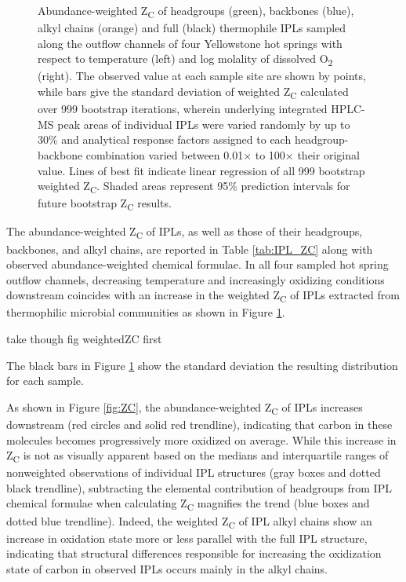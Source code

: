 {\begin{figure}[h]
\begin{subfigure}[b]{0.18\linewidth}
    \end{subfigure}
\caption[Abundance-weighted Z\textsubscript{C} of IPLs and their component parts]{Abundance-weighted Z\textsubscript{C} of headgroups (green), backbones (blue), alkyl chains (orange) and full (black) thermophile IPLs sampled along the outflow channels of four Yellowstone hot springs with respect to temperature (left) and log molality of dissolved O\textsubscript{2} (right). The observed value at each sample site are shown by points, while bars give the standard deviation of weighted Z\textsubscript{C} calculated over 999 bootstrap iterations, wherein underlying integrated HPLC-MS peak areas of individual IPLs were varied randomly by up to 30\% and analytical response factors assigned to each headgroup-backbone combination varied between 0.01$\times$ to 100$\times$ their original value. Lines of best fit indicate linear regression of all 999 bootstrap weighted Z\textsubscript{C}. Shaded areas represent 95\% prediction intervals for future bootstrap Z\textsubscript{C} results.}
\label{fig:weighted_ZC}
\end{figure}
\doublespace
\clearpage
}

The abundance-weighted Z\textsubscript{C} of IPLs, as well as those of their headgroups, backbones, and alkyl chains, are reported in Table \ref{tab:IPL_ZC} along with observed abundance-weighted chemical formulae. In all four sampled hot spring outflow channels, decreasing temperature and increasingly oxidizing conditions downstream coincides with an increase in the weighted Z\textsubscript{C} of IPLs extracted from thermophilic microbial communities as shown in Figure \ref{fig:weighted_ZC}.

take though fig weightedZC first


The black bars in Figure \ref{fig:weighted_ZC} show the standard deviation the resulting distribution for each sample.


As shown in Figure \ref{fig:ZC}, the abundance-weighted Z\textsubscript{C} of IPLs increases downstream (red circles and solid red trendline), indicating that carbon in these molecules becomes progressively more oxidized on average. While this increase in Z\textsubscript{C} is not as visually apparent based on the medians and interquartile ranges of nonweighted observations of individual IPL structures (gray boxes and dotted black trendline), subtracting the elemental contribution of headgroups from IPL chemical formulae when calculating Z\textsubscript{C} magnifies the trend (blue boxes and dotted blue trendline). Indeed, the weighted Z\textsubscript{C} of IPL alkyl chains show an increase in oxidation state more or less parallel with the full IPL structure, indicating that structural differences responsible for increasing the oxidization state of carbon in observed IPLs occurs mainly in the alkyl chains.

